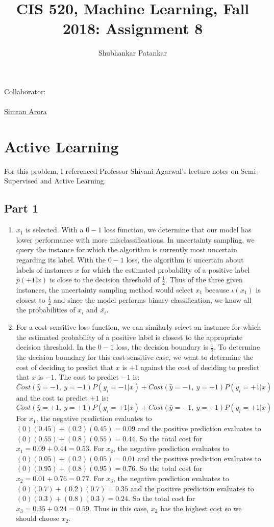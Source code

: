 \documentclass[english]{article}
\title{CIS 520, Machine Learning, Fall 2018: Assignment 8\\}
\date{}
\author{Shubhankar Patankar}
\begin{document}
\maketitle
{\normalsize Collaborator:\\
\\ \underline{Simran Arora}}


\section{Active Learning}
For this problem, I referenced Professor Shivani Agarwal's lecture notes on Semi-Supervised and Active Learning. 
\subsection{Part 1}
\begin{enumerate}
    \item $x_1$ is selected. With a $0-1$ loss function, we determine that our model has lower performance with more misclassifications. In uncertainty sampling, we query the instance for which the algorithm is currently most uncertain regarding its label. With the $0-1$ loss, the algorithm is uncertain about labels of instances $x$ for which the estimated probability of a positive label $\hat{p}(+1|x)$ is close to the decision threshold of $\frac{1}{2}$. Thus of the three given instances, the uncertainty sampling method would select $x_1$ because $\iota(x_1)$ is closest to $\frac{1}{2}$ and since the model performs binary classification, we know all the probabilities of ${x_i}$ and $\bar{x_i}$.
    \item For a cost-sensitive loss function, we can similarly select an instance for which the estimated probability of a positive label is closest to the appropriate decision threshold. In the $0-1$ loss, the decision boundary is $\frac{1}{2}$. To determine the decision boundary for this cost-sensitive case, we want to determine the cost of deciding to predict that $x$ is $+1$ against the cost of deciding to predict that $x$ is $-1$. The cost to predict $-1$ is: $$Cost(\hat{y} = -1, \: y = -1)P(y_i = -1 | x) + Cost(\hat{y} = -1, \: y = +1)P(y_i = +1 | x)$$ and the cost to predict $+1$ is: $$Cost(\hat{y} = +1, \: y = +1)P(y_i = +1 | x) + Cost(\hat{y} = -1, \: y = +1)P(y_i = +1 | x)$$
    For $x_1$, the negative prediction evaluates to $(0)(0.45) + (0.2)(0.45) = 0.09$ and the positive prediction evaluates to $(0)(0.55) + (0.8)(0.55) = 0.44$.  So the total cost for $x_1 = 0.09 + 0.44 = 0.53$. For $x_2$, the negative prediction evaluates to $(0)(0.05) + (0.2)(0.05) = 0.01$ and the positive prediction evaluates to $(0)(0.95) + (0.8)(0.95) = 0.76$. So the total cost for $x_2 = 0.01 + 0.76 = 0.77$. For $x_3$, the negative prediction evaluates to $(0)(0.7) + (0.2)(0.7) = 0.35$ and the positive prediction evaluates to $(0)(0.3) + (0.8)(0.3) = 0.24$. So the total cost for $x_3 = 0.35 + 0.24 = 0.59$. Thus in this case, $x_2$ has the highest cost so we should choose $x_2$.
\end{enumerate}
\end{document}
